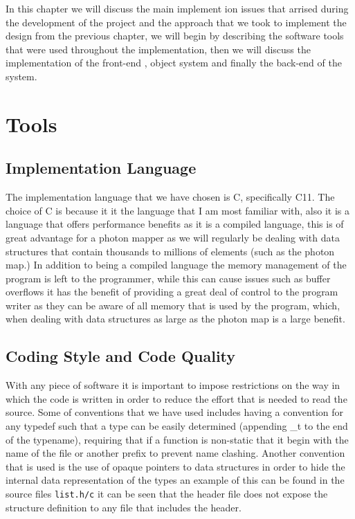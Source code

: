 \label{chap:implementation}
In this chapter we will discuss the main implement ion issues that arrised during the development of the project
and the approach that we took to implement the design from the previous chapter, we will begin by describing the
software tools that were used throughout the implementation, then we will discuss the implementation of the front-end
, object system and finally the back-end of the system.

\section{Tools} 
\subsection{Implementation Language}
The implementation language that we have chosen is C, specifically C11. The choice of C is because it it the
language that I am most familiar with, also it is a language that offers performance benefits as it is a compiled
language, this is of great advantage for a photon mapper as we will regularly be dealing with data structures
that contain thousands to millions of elements (such as the photon map.) In addition to being a compiled language
the memory management of the program is left to the programmer, while this can cause issues such as buffer overflows
it has the benefit of providing a great deal of control to the program writer as they can be aware of all memory
that is used by the program, which, when dealing with data structures as large as the photon map is a large benefit.

\subsection{Coding Style and Code Quality}
With any piece of software it is important to impose restrictions on the way in which the code is written in order
to reduce the effort that is needed to read the source. Some of conventions that we have used includes having a
convention for any typedef such that a type can be easily determined (appending \_t to the end of the typename),
requiring that if a function is non-static that it begin with the name of the file or another prefix to prevent
name clashing. Another convention that is used is the use of opaque pointers \cite{opaque-pointers} to data structures in order to
hide the internal data representation of the types an example of this can be found in the source files \texttt{list.h/c}
it can be seen that the header file does not expose the structure definition to any file that includes the header.

